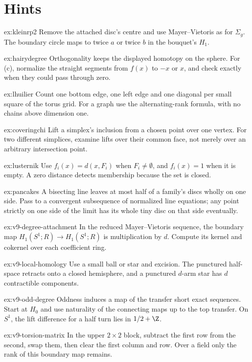 \section{Hints}

\begin{hint}{ex:kleinrp2}
Remove the attached disc's centre and use Mayer--Vietoris as for $\Sigma_g$. The boundary circle maps to twice $a$ or twice $b$ in the bouquet's $H_1$.
\end{hint}
\begin{hint}{ex:hairydegree}
Orthogonality keeps the displayed homotopy on the sphere. For (c), normalize the straight segments from $f(x)$ to $-x$ or $x$, and check exactly when they could pass through zero.
\end{hint}
\begin{hint}{ex:lhuilier}
Count one bottom edge, one left edge and one diagonal per small square of the torus grid. For a graph use the alternating-rank formula, with no chains above dimension one.
\end{hint}
\begin{hint}{ex:coveringchi}
Lift a simplex's inclusion from a chosen point over one vertex. For two different simplices, examine lifts over their common face, not merely over an arbitrary intersection point.
\end{hint}
\begin{hint}{ex:lusternik}
Use $f_i(x)=d(x,F_i)$ when $F_i\ne\emptyset$, and $f_i(x)=1$ when it is empty. A zero distance detects membership because the set is closed.
\end{hint}
\begin{hint}{ex:pancakes}
A bisecting line leaves at most half of a family's discs wholly on one side. Pass to a convergent subsequence of normalized line equations; any point strictly on one side of the limit has its whole tiny disc on that side eventually.
\end{hint}
\begin{hint}{ex:v9-degree-attachment}
In the reduced Mayer--Vietoris sequence, the boundary map $H_1(S^1;R)\to H_1(S^1;R)$ is multiplication by $d$. Compute its kernel and cokernel over each coefficient ring.
\end{hint}
\begin{hint}{ex:v9-local-homology}
Use a small ball or star and excision. The punctured half-space retracts onto a closed hemisphere, and a punctured $d$-arm star has $d$ contractible components.
\end{hint}
\begin{hint}{ex:v9-odd-degree}
Oddness induces a map of the transfer short exact sequences. Start at $H_0$ and use naturality of the connecting maps up to the top transfer. On $S^1$, the lift difference for a half turn lies in $1/2+\Z$.
\end{hint}
\begin{hint}{ex:v9-torsion-matrix}
In the upper $2\times2$ block, subtract the first row from the second, swap them, then clear the first column and row. Over a field only the rank of this boundary map remains.
\end{hint}

